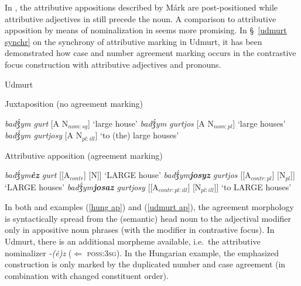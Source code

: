 {In , the attributive appositions described by Márk are post-positioned while attributive adjectives in  still precede the noun. A comparison to attributive apposition by means of nominalization in  seems more promising. In \S~\ref{udmurt synchr} on the synchrony of attributive marking in Udmurt, it has been demonstrated how case and number agreement marking occurs in the contrastive focus construction with attributive adjectives and pronouns.
\begin{exe} \label{udmurt ap}
\ex \rm{Udmurt \citep{winkler2001}}
\begin{xlist}
\ex 	\rm{Juxtaposition (no agreement marking)}
\begin{xlist}
\ex	\textit{badǯ́ym gurt} 				\rm{[A N$_{nom:sg}$] ‘large house’}
\ex	\textit{badǯ́ym gurtjos} 			\rm{[A N$_{nom:pl}$] ‘large houses’}
\ex	\textit{badǯ́ym gurtjosy} 			\rm{[A N$_{pl:ill}$] ‘to (the) large houses’}
\end{xlist}
\ex	\rm{Attributive apposition (agreement marking)}
\begin{xlist}
\ex	\textit{badǯ́ym\textbf{ėz} gurt} 		\rm{[[A$_{contr}$] [N]] ‘LARGE house’}
\ex	\textit{badǯ́ym\textbf{josyz} gurtjos} 	\rm{[[A$_{contr:pl}$] [N$_{pl}$]] ‘LARGE houses’}
\ex	\textit{badǯ́ym\textbf{josaz} gurtjosy} 	\rm{[[A$_{contr:pl:ill}$] [N$_{pl:ill}$]] ‘to LARGE houses’}
\end{xlist}
\end{xlist}
\end{exe}
In both  and  examples (\ref{hung ap}) and (\ref{udmurt ap}), the agreement morphology is syntactically spread from the (semantic) head noun to the adjectival modifier only in appositive noun phrases (with the modifier in contrastive focus). In Udmurt, there is an additional morpheme available, i.e.~the attributive nominalizer \textit{-(ė)z} ($\Leftarrow$ \textsc{poss:3sg}). In the Hungarian example, the emphasized construction is only marked by the duplicated number and case agreement (in combination with changed constituent order).

}
